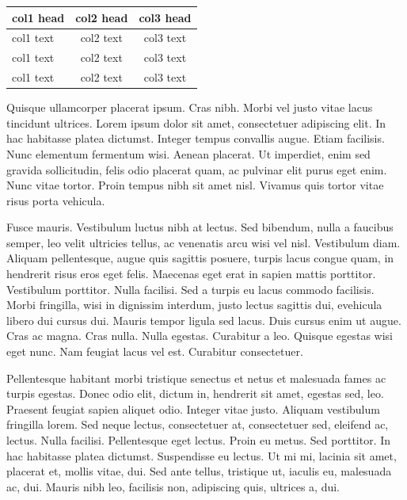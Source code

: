 \documentclass[AMA,STIX1COL]{WileyNJD-SP}
\begin{document}
\begin{center}
\begin{tabular*}{300pt}{@{\extracolsep\fill}lcc@{\extracolsep\fill}}%
\toprule
\textbf{col1 head} & \textbf{col2 head} & \textbf{col3 head} \\
\midrule
col1 text & col2 text & col3 text \\
col1 text & col2 text & col3 text \\
col1 text & col2 text & col3 text \\
\bottomrule
\end{tabular*}
\end{center}


Quisque ullamcorper placerat ipsum. Cras nibh. Morbi vel justo vitae lacus tincidunt ultrices. Lorem ipsum dolor sit
amet, consectetuer adipiscing elit. In hac habitasse platea dictumst. Integer tempus convallis augue. Etiam facilisis.
Nunc elementum fermentum wisi. Aenean placerat. Ut imperdiet, enim sed gravida sollicitudin, felis odio placerat
quam, ac pulvinar elit purus eget enim. Nunc vitae tortor. Proin tempus nibh sit amet nisl. Vivamus quis tortor
vitae risus porta vehicula.

Fusce mauris. Vestibulum luctus nibh at lectus. Sed bibendum, nulla a faucibus semper, leo velit ultricies tellus, ac
venenatis arcu wisi vel nisl. Vestibulum diam. Aliquam pellentesque, augue quis sagittis posuere, turpis lacus congue
quam, in hendrerit risus eros eget felis. Maecenas eget erat in sapien mattis porttitor. Vestibulum porttitor. Nulla
facilisi. Sed a turpis eu lacus commodo facilisis. Morbi fringilla, wisi in dignissim interdum, justo lectus sagittis dui, evehicula libero dui cursus dui. Mauris tempor ligula sed lacus. Duis cursus enim ut augue. Cras ac magna. Cras nulla.
Nulla egestas. Curabitur a leo. Quisque egestas wisi eget nunc. Nam feugiat lacus vel est. Curabitur consectetuer.

Pellentesque habitant morbi tristique senectus et netus et malesuada fames ac turpis egestas. Donec odio elit,
dictum in, hendrerit sit amet, egestas sed, leo. Praesent feugiat sapien aliquet odio. Integer vitae justo. Aliquam
vestibulum fringilla lorem. Sed neque lectus, consectetuer at, consectetuer sed, eleifend ac, lectus. Nulla facilisi.
Pellentesque eget lectus. Proin eu metus. Sed porttitor. In hac habitasse platea dictumst. Suspendisse eu lectus. Ut
mi mi, lacinia sit amet, placerat et, mollis vitae, dui. Sed ante tellus, tristique ut, iaculis eu, malesuada ac, dui.
Mauris nibh leo, facilisis non, adipiscing quis, ultrices a, dui.
\end{document}
